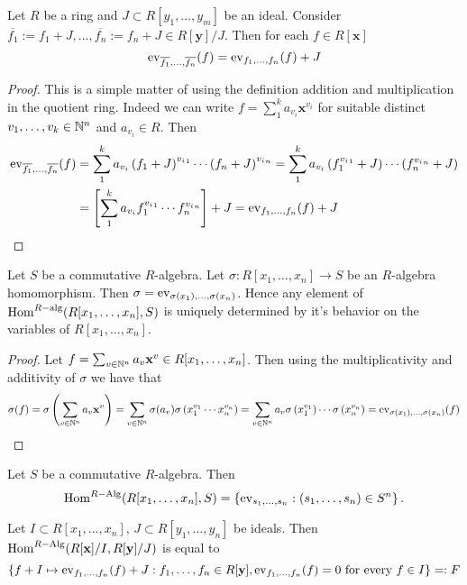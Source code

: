\begin{lemma}\label{EvaluationCommutesWithTakingQuotient}
    Let $R$ be a ring and $J\subset R[y_1,\dots,y_m]$ be an ideal. Consider $\overline{f_1}:=f_1+J,\dots,\overline{f_n}:=f_n+J\in R[\mathbf{y}]/J$. Then for each $f\in R[\mathbf{x}]$
    $$\mathrm{ev}_{\overline{f_1},\dots,\overline{f_n}}(f) = \mathrm{ev}_{f_1,\dots,f_n}(f)+J$$
\end{lemma}
\begin{proof}
    This is a simple matter of using the definition addition and multiplication in the quotient ring. Indeed we can write $f=\sum_1^k a_{v_i}\mathbf{x}^{v_i}$ for suitable distinct $v_1,\dots,v_k\in \mathbb{N}^n$ and $a_{v_i}\in R$. Then 
    \begin{align*}
        \mathrm{ev}_{\overline{f_1},\dots,\overline{f_n}}(f) &= \sum_1^k a_{v_i}\left(f_1+J \right)^{{v_i}_1}\cdots \left(f_n+J \right)^{{v_i}_n} =\sum_1^k a_{v_i}\left(f_1^{{v_i}_1}+J \right)\cdots \left(f_n^{{v_i}_n}+J \right)\\ &= \left[\sum_1^k a_{v_i} f_1^{{v_i}_1}\cdots f_n^{{v_i}_n}\right] + J
        = \mathrm{ev}_{f_1,\dots,f_n}(f)+J
    \end{align*}
\end{proof}
\begin{proposition}\label{ClasificationOfAlgebraMaps}
    Let $S$ be a commutative $R$-algebra. Let $\sigma : R[x_1,\dots,x_n] \rightarrow S$ be an $R$-algebra homomorphism. Then $\sigma = \mathrm{ev}_{\sigma(x_1),\dots,\sigma(x_n)}$. Hence any element of $\mathrm{Hom}^{R-\text{alg}}(R[x_1,\dots,x_n],S)$ is uniquely determined by it's behavior on the variables of $R[x_1,\dots,x_n]$.  
\end{proposition}
\begin{proof}
    Let $f= \sum_{v\in \mathbb{N}^n} a_v\mathbf{x}^v\in R[x_1,\dots,x_n]$. Then using the multiplicativity and additivity of $\sigma$ we have that 
    $$\sigma(f)= \sigma\left(\sum_{v\in \mathbb{N}^n} a_v\mathbf{x}^v\right) = \sum_{v\in \mathbb{N}^n} \sigma(a_v) \sigma\left(x_1^{v_1}\cdots x_n^{v_n}\right) = \sum_{v\in \mathbb{N}^n} a_v\sigma\left(x_1^{v_1}\right)\cdots\sigma\left(x_n^{v_n}\right)= \mathrm{ev}_{\sigma(x_1),\dots,\sigma(x_n)}(f)$$
\end{proof}
\begin{corollary}\label{AlgebraHomomorphismFromPolynomialRingIsJustEvaluation}
    Let $S$ be a commutative $R$-algebra. Then 
    $$\mathrm{Hom}^{R-\text{Alg}}(R[x_1,\dots,x_n],S) = \left\{ \mathrm{ev}_{s_1,\dots,s_n} : (s_1,\dots,s_n)\in S^n \right\}.$$
\end{corollary}
\begin{corollary}
    Let $I\subset R[x_1,\dots,x_n]$, $J\subset R[y_1,\dots,y_n]$ be ideals. Then $\mathrm{Hom}^{R-\text{Alg}}(R[\mathbf{x}]/I,R[\mathbf{y}]/J)$ is equal to  
    $$\left\{ f+I\mapsto \mathrm{ev}_{f_1,\dots,f_n}(f)+J : f_1,\dots,f_n\in R[\mathbf{y}], \mathrm{ev}_{f_1,\dots,f_n}(f)=0 \text{ for every } f\in I \right\} =: F$$
\end{corollary}
